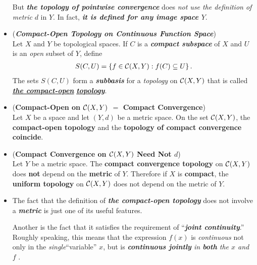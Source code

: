 \documentclass[11pt]{article}
\begin{document}
\begin{itemize}
\begin{remark}
But \emph{\textbf{the topology of  pointwise convergence}} does \emph{not use the definition of metric} $d$ in $Y$. In fact, \emph{\textbf{it is defined for any image space $Y$}}.
\end{remark}

\item \begin{definition} (\emph{\textbf{Compact-Open Topology on Continuous Function Space}})\\
Let $X$ and $Y$ be topological spaces. If $C$ is a \emph{\textbf{compact subspace}} of $X$ and $U$ is an \emph{open} subset of $Y$, define
\begin{align*}
S(C,U) = \left\{ f \in {\mathcal C}(X, Y): f(C) \subseteq U\right\}.
\end{align*}
The sets $S(C, U)$ form a \emph{\textbf{subbasis}} for a \emph{topology} on ${\mathcal C}(X, Y)$ that is called \underline{\emph{\textbf{the compact-open}}} \underline{\emph{\textbf{topology}}}.
\end{definition}

\item \begin{proposition} (\textbf{Compact-Open on ${\mathcal C}(X, Y)$ $=$ Compact Convergence}) \citep{munkres2000topology}\\
Let $X$ be a space and let $(Y, d)$ be a metric space. On the set ${\mathcal C}(X, Y)$, the \textbf{compact-open topology} and the \textbf{topology of compact convergence} \textbf{coincide}.
\end{proposition}

\item \begin{corollary}(\textbf{Compact Convergence on ${\mathcal C}(X, Y)$ Need Not $d$}) \citep{munkres2000topology}\\
Let $Y$ be a metric space. The \textbf{compact convergence topology} on ${\mathcal C}(X, Y)$ does  \textbf{not} depend on the \textbf{metric} of $Y$. Therefore if $X$ is \textbf{compact}, the \textbf{uniform topology} on ${\mathcal C}(X, Y)$ does not depend on the metric of $Y$.
\end{corollary}

\item \begin{remark} 
The fact that the definition of \emph{\textbf{the compact-open topology}} does not involve a \emph{\textbf{metric}} is just one of its useful features. 

Another is the fact that it satisfies the requirement of ``\emph{\textbf{joint continuity}}.” Roughly speaking, this means that the expression $f(x)$ is
\emph{continuous} not only in the \emph{single}``variable”  $x$, but is \emph{\textbf{continuous jointly} in \textbf{both} the $x$ and $f$} .
\end{remark}


\end{itemize}
\end{document}
